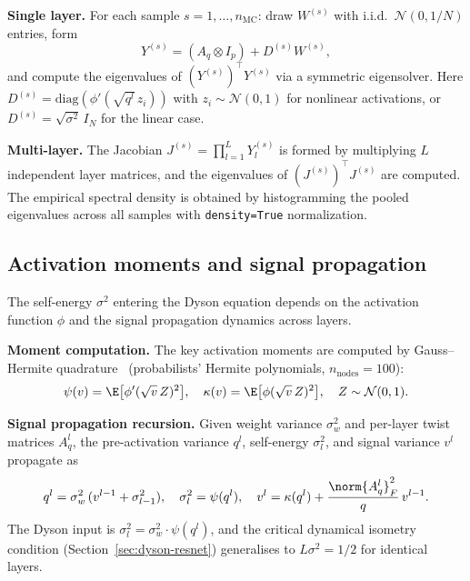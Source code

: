 \medskip
\noindent\textbf{Single layer.}
For each sample $s = 1, \ldots, n_{\mathrm{MC}}$: draw $W^{(s)}$ with i.i.d.\ $\mathcal{N}(0, 1/N)$ entries, form
\begin{equation}
Y^{(s)} = (A_q \otimes I_p) + D^{(s)} W^{(s)},
\end{equation}
and compute the eigenvalues of $(Y^{(s)})^\top Y^{(s)}$ via a symmetric eigensolver. Here $D^{(s)} = \mathrm{diag}(\phi'(\sqrt{q^l} \, z_i))$ with $z_i \sim \mathcal{N}(0,1)$ for nonlinear activations, or $D^{(s)} = \sqrt{\sigma^2}\, I_N$ for the linear case.

\medskip
\noindent\textbf{Multi-layer.}
The Jacobian $J^{(s)} = \prod_{l=1}^L Y_l^{(s)}$ is formed by multiplying $L$ independent layer matrices, and the eigenvalues of $(J^{(s)})^\top J^{(s)}$ are computed. The empirical spectral density is obtained by histogramming the pooled eigenvalues across all samples with \texttt{density=True} normalization.

\subsection{Activation moments and signal propagation}\label{app:signal-prop}

The self-energy $\sigma^2$ entering the Dyson equation depends on the activation function $\phi$ and the signal propagation dynamics across layers.

\medskip
\noindent\textbf{Moment computation.}
The key activation moments are computed by Gauss--Hermite quadrature~\cite{golub1969calculation} (probabilists' Hermite polynomials, $n_{\mathrm{nodes}} = 100$):
\begin{equation}\label{eq:activation-moments-app}
\psi(v) = \E\bigl[\phi'(\sqrt{v}\, Z)^2\bigr], \quad \kappa(v) = \E\bigl[\phi(\sqrt{v}\, Z)^2\bigr], \quad Z \sim \mathcal{N}(0, 1).
\end{equation}

\medskip
\noindent\textbf{Signal propagation recursion.}
Given weight variance $\sigma_w^2$ and per-layer twist matrices $A_q^l$, the pre-activation variance $q^l$, self-energy $\sigma^2_l$, and signal variance $v^l$ propagate as
\begin{equation}\label{eq:signal-prop-app}
q^l = \sigma_w^2\,(v^{l-1} + \sigma^2_{l-1}), \quad \sigma^2_l = \psi(q^l), \quad v^l = \kappa(q^l) + \frac{\norm{A_q^l}_F^2}{q}\, v^{l-1}.
\end{equation}
The Dyson input is $\sigma^2_l = \sigma_w^2 \cdot \psi(q^l)$, and the critical dynamical isometry condition (Section~\ref{sec:dyson-resnet}) generalises to $L \sigma^2 = 1/2$ for identical layers.
